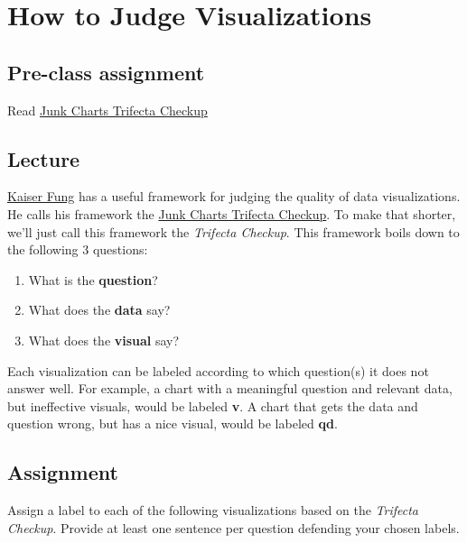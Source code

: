 \documentclass[]{book}
\providecommand{\tightlist}{%
  \setlength{\itemsep}{0pt}\setlength{\parskip}{0pt}}
\begin{document}
\hypertarget{trifecta}{\chapter{How to Judge
Visualizations}\label{trifecta}}

\section{Pre-class assignment}\label{pre-class-assignment}

Read
\href{http://junkcharts.typepad.com/junk_charts/junk-charts-trifecta-checkup-the-definitive-guide.html}{Junk
Charts Trifecta Checkup}

\section{Lecture}\label{lecture}

\href{http://junkcharts.typepad.com/numbersruleyourworld/biography.html}{Kaiser
Fung} has a useful framework for judging the quality of data
visualizations. He calls his framework the
\href{http://junkcharts.typepad.com/junk_charts/junk-charts-trifecta-checkup-the-definitive-guide.html}{Junk
Charts Trifecta Checkup}. To make that shorter, we'll just call this
framework the \emph{Trifecta Checkup}. This framework boils down to the
following 3 questions:

\begin{enumerate}
\def\labelenumi{\arabic{enumi}.}
\tightlist
\item
  What is the \textbf{question}?
\item
  What does the \textbf{data} say?
\item
  What does the \textbf{visual} say?
\end{enumerate}

Each visualization can be labeled according to which question(s) it does
not answer well. For example, a chart with a meaningful question and
relevant data, but ineffective visuals, would be labeled \textbf{v}. A
chart that gets the data and question wrong, but has a nice visual,
would be labeled \textbf{qd}.

\section{Assignment}\label{assignment-1}

Assign a label to each of the following visualizations based on the
\emph{Trifecta Checkup}. Provide at least one sentence per question
defending your chosen labels.


\end{document}
